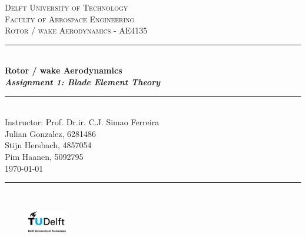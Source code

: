 \documentclass[a4paper]{memoir}
\begin{document}
\setlength{\parindent}{0em}

\AtBeginShipoutNext{\AtBeginShipoutNext{\AtBeginShipoutDiscard}}
\begin{titlingpage}

\mainmatter 

\newcommand{\HRule}{\rule{\linewidth}{0.5mm}} 				
\center 
\textsc{\Large Delft University of Technology}\\[0.5cm]
\textsc{\Large Faculty of Aerospace Engineering}\\[0.2cm]
\textsc{\large 
Rotor / wake Aerodynamics - AE4135 }\\[1cm] 							
\HRule \\[0.5cm]
{ \huge \bfseries 
Rotor / wake Aerodynamics \\ \large{\emph{Assignment 1: Blade Element Theory}} }\\[0.2cm]
\HRule \\[0.5cm]
\large
Instructor: Prof. Dr.ir. C.J. Simao Ferreira \\
Julian Gonzalez, 6281486 \\
Stijn Hersbach, 4857054 \\
Pim Haanen, 5092795 \\
\large{\large \today}\\
\vspace{5pt}
\HRule \\[0.5cm]
\vspace{5pt}





\begin{figure}[b]
\centering
\includegraphics[width=0.15\textwidth]{Figures/tu_delft_logo_jpg.png}
\end{figure}
\end{titlingpage}
\pagestyle{ruled}

\large

% 

\begin{KeepFromToc}
    \tableofcontents
\end{KeepFromToc}

% 
\setcounter{page}{2}







\printbibliography[heading=bibintoc,title=References]
\end{document}
